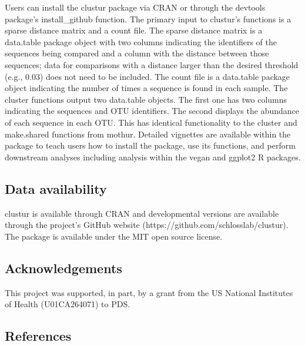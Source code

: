 \documentclass[
  11pt,
]{article}
\begin{document}
Users can install the clustur package via CRAN or through the devtools
package's install\_github function. The primary input to clustur's
functions is a sparse distance matrix and a count file. The sparse
distance matrix is a data.table package object with two columns
indicating the identifiers of the sequences being compared and a column
with the distance between those sequences; data for comparisons with a
distance larger than the desired threshold (e.g., 0.03) does not need to
be included. The count file is a data.table package object indicating
the number of times a sequence is found in each sample. The cluster
functions output two data.table objects. The first one has two columns
indicating the sequences and OTU identifiers. The second displays the
abundance of each sequence in each OTU. This has identical functionality
to the cluster and make.shared functions from mothur. Detailed vignettes
are available within the package to teach users how to install the
package, use its functions, and perform downstream analyses including
analysis within the vegan and ggplot2 R packages.

\subsection{Data availability}\label{data-availability}

clustur is available through CRAN and developmental versions are
available through the project's GitHub website
(https://github.com/schlosslab/clustur). The package is available under
the MIT open source license.

\subsection{Acknowledgements}\label{acknowledgements}

This project was supported, in part, by a grant from the US National
Institutes of Health (U01CA264071) to PDS.

\newpage

\subsection{References}\label{references}
\end{document}
